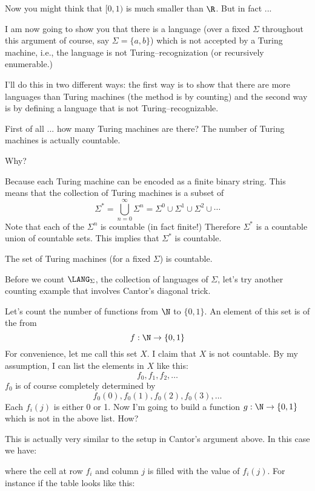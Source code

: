 Now you might think that $[0,1)$ is much smaller than $\R$.
But in fact ...



I am now going to show you that there is a language
(over a fixed $\Sigma$ throughout this argument of course, 
say $\Sigma = \{a,b\}$)
which is not accepted by a Turing machine, i.e.,
the language is not Turing--recognization (or recursively enumerable.)

I'll do this in two different ways:
the first way is to show that there
are more languages than Turing machines (the method is by counting)
and the second way is by defining a language that is not Turing--recognizable.

First of all ... how many Turing machines are there?
The number of Turing machines is actually countable.

Why?

Because each Turing machine can be encoded as a finite binary string.
This means that the collection of Turing machines
is a subset of 
\[
\Sigma^* 
= \bigcup_{n=0}^\infty \Sigma^n 
= \Sigma^0 \cup \Sigma^1 \cup \Sigma^2 \cup \cdots
\]
Note that each of the $\Sigma^n$ is countable (in fact finite!)
Therefore $\Sigma^*$ is a countable union of countable sets.
This implies that $\Sigma^*$ is countable.

\begin{thm}
The set of Turing machines (for a fixed $\Sigma$) is countable.
\end{thm}

Before we count $\LANG_\Sigma$,
the collection of languages of $\Sigma$,
let's try another counting example that involves Cantor's diagonal trick.

Let's count the number of functions from $\N$ to $\{0, 1\}$.
An element of this set is of the from
\[
f: \N \rightarrow \{0, 1\}
\]
For convenience, let me call this set $X$.
I claim that $X$ is not countable.
By my assumption, I can list the elements in $X$ like this:
\[
f_0, f_1, f_2, \ldots
\]
$f_0$ is of course completely determined by 
\[
f_0(0), f_0(1), f_0(2), f_0(3), \ldots
\]
Each $f_i(j)$ is either 0 or 1.
Now I'm going to build a function $g : \N \rightarrow \{0, 1\}$
which is not in the above list.
How?

This is actually very similar to the setup in Cantor's argument
above.
In this case we have:



where the cell at row $f_i$ and column $j$ is filled with the
value of $f_i(j)$.
For instance if the table looks like this:


